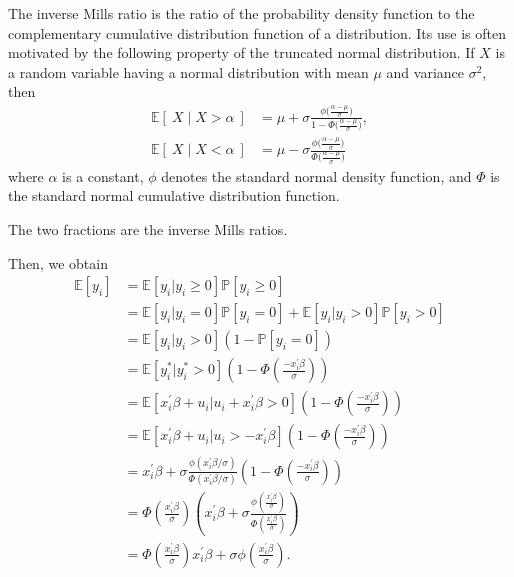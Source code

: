 \begin{note}
    The inverse Mills ratio is the ratio of the 
    probability density function to the complementary 
    cumulative distribution function of a distribution. 
    Its use is often motivated by the following property 
    of the truncated normal distribution. 
    If $X$ is a random variable having a normal distribution 
    with mean $\mu$ and variance $\sigma^2$, then
    \begin{align*}
        \mathbb{E}[\:X\mid X>\alpha\:]&=\mu+\sigma\frac{\phi\Big(\frac{\alpha-\mu}\sigma\Big)}{1-\Phi\Big(\frac{\alpha-\mu}\sigma\Big)},\\
        \mathbb{E}[\:X\mid X<\alpha\:]&=\mu-\sigma\frac{\phi\Big(\frac{\alpha-\mu}\sigma\Big)}{\Phi\Big(\frac{\alpha-\mu}\sigma\Big)}
    \end{align*}
    where $\alpha$ is a constant, 
    $\phi$ denotes the standard normal density function, 
    and $\Phi$ is the standard normal cumulative distribution function.

    The two fractions are the inverse Mills ratios.
\end{note}

Then, we obtain
\begin{align*}
    \mathbb{E}[y_i] &= \mathbb{E}[y_i|y_i \geq 0] \mathbb{P}[y_i \geq 0] \\
    &= \mathbb{E}[y_i|y_i = 0]\mathbb{P}[y_i = 0] + \mathbb{E}[y_i|y_i > 0]\mathbb{P}[y_i > 0]\\
    &= \mathbb{E}[y_i|y_i > 0](1-\mathbb{P}[y_i = 0])\\
    &= \mathbb{E}[y_i^*|y_i^*>0]\left(1-\Phi\left(\frac{-x_i^{\prime} \beta}{\sigma}\right)\right)\\
    &= \mathbb{E}[x_i^{\prime} \beta + u_i|u_i +x_i^{\prime} \beta>0]\left(1-\Phi\left(\frac{-x_i^{\prime} \beta}{\sigma}\right)\right)\\
    &= \mathbb{E}[x_i^{\prime} \beta + u_i|u_i > -x_i^{\prime} \beta]\left(1-\Phi\left(\frac{-x_i^{\prime} \beta}{\sigma}\right)\right)\\
    &= x_i^{\prime} \beta + \sigma \frac{\phi(x_i^{\prime} \beta/\sigma)}{\Phi(x_i^{\prime} \beta/\sigma)}\left(1-\Phi\left(\frac{-x_i^{\prime} \beta}{\sigma}\right)\right)\\
    &= \Phi\left(\frac{x_i^{\prime} \beta}{\sigma}\right)\left(x_i^{\prime} \beta +\sigma \frac{\phi\left(\frac{x_i^{\prime} \beta}{\sigma}\right)}{\Phi\left(\frac{x_i^{\prime} \beta}{\sigma}\right)}\right)\\
    &= \Phi \left(\frac{x_i^{\prime} \beta}{\sigma}\right) x_i^{\prime} \beta +\sigma \phi\left(\frac{x_i^{\prime} \beta}{\sigma}\right).
\end{align*}

